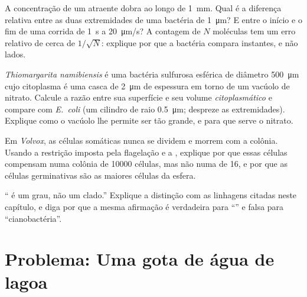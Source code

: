 \begin{exercise}[$\star\star$]\label{exo:b2:unicellular-diversity:9}
A concentração de um atraente dobra ao longo de \qty{1}{mm}. Qual é a
diferença relativa entre as duas extremidades de uma bactéria de
\qty{1}{\micro m}? E entre o início e o fim de uma corrida de
\qty{1}{s} a \qty{20}{\micro m/s}? A contagem de $N$ moléculas tem um
erro relativo de cerca de $1/\sqrt{N}$: explique por que a bactéria
compara instantes, e não lados.
\end{exercise}

\begin{exercise}[$\star\star\star$]\label{exo:b2:unicellular-diversity:10}
\emph{Thiomargarita namibiensis} é uma bactéria sulfurosa esférica de
diâmetro \qty{500}{\micro m} cujo citoplasma é uma casca de
\qty{2}{\micro m} de espessura em torno de um vacúolo de nitrato.
Calcule a razão entre sua superfície e seu volume
\emph{citoplasmático} e compare com \emph{E.~coli} (um cilindro de raio
\qty{0.5}{\micro m}; despreze as extremidades). Explique como o
vacúolo lhe permite ser tão grande, e para que serve o nitrato.
\end{exercise}

\begin{exercise}[$\star\star\star$]\label{exo:b2:unicellular-diversity:11}
Em \emph{Volvox}, as células somáticas nunca se dividem e morrem com a
colônia. Usando a restrição imposta pela flagelação e a ,
explique por que essas células compensam numa colônia de \num{10000}
células, mas não numa de 16, e por que as células germinativas são as
maiores células da esfera.
\end{exercise}

\begin{exercise}[$\star\star\star$]\label{exo:b2:unicellular-diversity:12}
`` é um grau, não um clado.'' Explique a distinção com as
linhagens citadas neste capítulo, e diga por que a mesma afirmação é
verdadeira para ``'' e falsa para ``cianobactéria''.
\end{exercise}

\section{Problema: Uma gota de água de lagoa}

